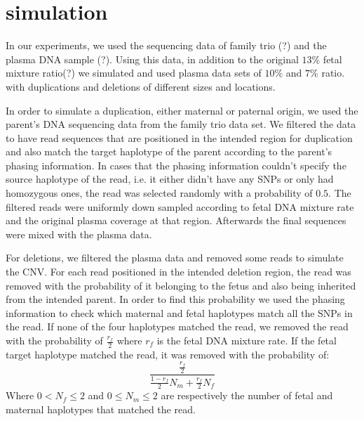\section{simulation}

	In our experiments, we used the sequencing data of family trio (?) and the plasma DNA sample (?). Using this data, in addition to the original $13\%$ fetal mixture ratio(?) we simulated and used plasma data sets of $10\%$ and $7\%$ ratio. with duplications and deletions of different sizes and locations.

	In order to simulate a duplication, either maternal or paternal origin, we used the parent's DNA sequencing data from the family trio data set. We filtered the data to have read sequences that are positioned in the intended region for duplication and also match the target haplotype of the parent according to the parent's phasing information.	In cases that the phasing information couldn't specify the source haplotype of the read, i.e. it either didn't have any SNPs or only had homozygous ones, the read was selected randomly with a probability of $0.5$. The filtered reads were uniformly down sampled according to fetal DNA mixture rate and the original plasma coverage at that region. Afterwards the final sequences were mixed with the plasma data.
	
	For deletions, we filtered the plasma data and removed some reads to simulate the CNV. For each read positioned in the intended deletion region, the read was removed with the probability of it belonging to the fetus and also being inherited from the intended parent. In order to find this probability we used the phasing information to check which maternal and fetal haplotypes match all the SNPs in the read. If none of the four haplotypes matched the read, we removed the read with the probability of $\frac{r_f}{2}$ where $r_f$ is the fetal DNA mixture rate. If the fetal target haplotype matched the read, it was removed with the probability of:
	$$\frac{ \frac{r_f}{2} } { \frac{1-r_f}{2} N_m + \frac{r_f}{2} N_f}$$
	Where $0 < N_f \leq 2$ and $0 \leq N_m \leq 2$ are respectively the number of fetal and maternal haplotypes that matched the read.
	
